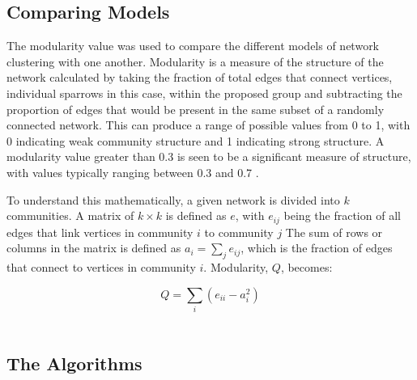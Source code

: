 \documentclass[11pt]{article}
\begin{document}
\subsection{Comparing Models}

\par The modularity value was used to compare the different models of network clustering with one another.  Modularity is a measure of the structure of the network calculated by taking the fraction of total edges that connect vertices, individual sparrows in this case, within the proposed group and subtracting the proportion of edges that would be present in the same subset of a randomly connected network\citep{Newman2003}⁠.  This can produce a range of possible values from 0 to 1, with 0 indicating weak community structure and 1 indicating strong structure.  A modularity value greater than 0.3 is seen to be a significant measure of structure, with values typically ranging between 0.3 and 0.7 \citep{Newman2003}⁠.  
\par To understand this mathematically, a given network is divided into $k$ communities.  A matrix of $k\times k$ is defined as $e$, with $e_{ij}$ being the fraction of all edges that link vertices in community $i$ to community $j$  The sum of rows or columns in the matrix is defined as $a_{i}=\sum_{j}e_{ij}$, which is the fraction of edges that connect to vertices in community $i$.  Modularity, $Q$, becomes:

	
    \begin{equation}
    Q=\sum_{i}\left(e_{ii}-a_{i}^{2}\right)
    \end{equation}\\
    
 
\subsection{The Algorithms}
\end{document}
